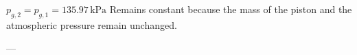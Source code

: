 \( p_{g,2} = p_{g,1} = 135.97 \, \text{kPa} \)  
Remains constant because the mass of the piston and the atmospheric pressure remain unchanged.  

---